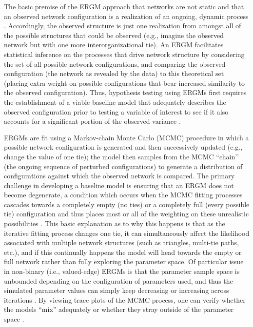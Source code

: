 \documentclass[12pt,a4paper,titlepage]{article}
\begin{document}
The basic premise of the ERGM approach that networks are not static and that an observed network configuration is a realization of an ongoing, dynamic process \parencite{lusher2013-a}. Accordingly, the observed structure is just one realization from amongst all of the possible structures that could be observed (e.g., imagine the observed network but with one more interorganizational tie). An ERGM facilitates statistical inference on the processes that drive network structure by considering the set of all possible network configurations, and comparing the observed configuration (the network as revealed by the data) to this theoretical set (placing extra weight on possible configurations that bear increased similarity to the observed configuration). Thus, hypothesis testing using ERGMs first requires the establishment of a viable baseline model that adequately describes the observed configuration prior to testing a variable of interest to see if it also accounts for a significant portion of the observed variance \parencite{kolaczyk2009,lusher2013-a}.

ERGMs are fit using a Markov-chain Monte Carlo (MCMC) procedure in which a possible network configuration is generated and then successively updated (e.g., change the value of one tie); the model then samples from the MCMC ``chain’’ (the ongoing sequence of perturbed configurations) to generate a distribution of configurations against which the observed network is compared. The primary challenge in developing a baseline model is ensuring that an ERGM does not become degenerate, a condition which occurs when the MCMC fitting processes cascades towards a completely empty (no ties) or a completely full (every possible tie) configuration and thus places most or all of the weighting on these unrealistic possibilities \parencite{handcock2003, kolaczyk2009}. This basic explanation as to why this happens is that as the iterative fitting process changes one tie, it can simultaneously affect the likelihood associated with multiple network structures (such as triangles, multi-tie paths, etc.), and if this continually happens the model will head towards the empty or full network rather than fully exploring the parameter space. Of particular issue in non-binary (i.e., valued-edge) ERGMs is that the parameter sample space is unbounded depending on the configuration of parameters used, and thus the simulated parameter values can simply keep decreasing or increasing across iterations \parencite{krivitsky2013}. By viewing trace plots of the MCMC process, one can verify whether the models “mix” adequately or whether they stray outside of the parameter space \parencite{krivitsky2012}.
\end{document}
